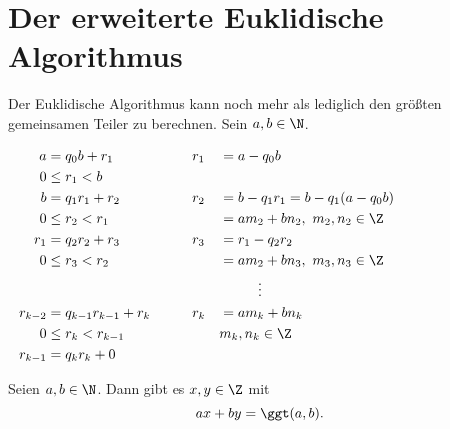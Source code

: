 \section*{Der erweiterte Euklidische Algorithmus}

Der Euklidische Algorithmus kann noch mehr als lediglich den größten gemeinsamen Teiler zu berechnen. Sein $a,b \in \N$.

\begin{alignat*}{3}
	a &= q_0 b +r_1 &&\qquad r_1 &&= a - q_0 b\\
	0 &\leq r_1 < b\\
	b &= q_1 r_1 + r_2 &&\qquad r_2 &&= b - q_1 r_1 = b - q_1(a-q_0b)\\
	0 &\leq r_2 < r_1 &&\qquad &&= am_2 + bn_2,\ m_2,n_2 \in \Z\\
	r_1 &= q_2 r_2 + r_3 &&\qquad r_3 &&= r_1 - q_2 r_2\\
	0 &\leq r_3 < r_2 &&\qquad &&= am_2 + bn_3,\ m_3,n_3 \in \Z\\
	\noalign{\centering $\vdots$}
	r_{k-2} &= q_{k-1}r_{k-1} + r_k &&\qquad r_k &&= am_k + bn_k\\
	0 &\leq r_k < r_{k-1} &&\qquad &&m_k,n_k \in \Z\\
	r_{k-1} &= q_k r_k + 0
\end{alignat*}

\begin{thm}\autolabel
	Seien $a,b \in \N$. Dann gibt es \( x,y \in \Z \) mit
	\[ ax + by = \ggt(a,b). \]
\end{thm}